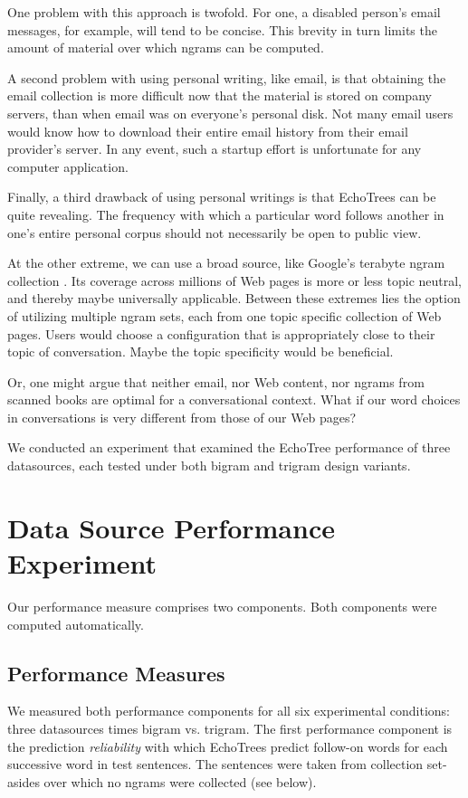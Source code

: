 \documentclass{sigchi}
\begin{document}
One problem with this approach is twofold. For one, a disabled
person's email messages, for example, will tend to be concise. This
brevity in turn limits the amount of material over which ngrams can be
computed. 

A second problem with using personal writing, like email, is that
obtaining the email collection is more difficult now that the material
is stored on company servers, than when email was on everyone's
personal disk. Not many email users would know how to download their
entire email history from their email provider's server. In any event,
such a startup effort is unfortunate for any computer application.

Finally, a third drawback of using personal writings is that EchoTrees
can be quite revealing. The frequency with which a particular word
follows another in one's entire personal corpus should not necessarily
be open to public view.

At the other extreme, we can use a broad source, like Google's
terabyte ngram collection \cite{google1T}. Its coverage across millions of
Web pages is more or less topic neutral, and thereby maybe universally
applicable. Between these extremes lies the option of utilizing
multiple ngram sets, each from one topic specific collection of Web
pages. Users would choose a configuration that is appropriately close
to their topic of conversation. Maybe the topic specificity would be
beneficial. 

Or, one might argue that neither email, nor Web content, nor ngrams
from scanned books \cite{anc} are optimal for a conversational
context. What if our word choices in conversations is very different
from those of our Web pages?

We conducted an experiment that examined the EchoTree performance of
three datasources, each tested under both bigram and trigram design
variants.

\section{Data Source Performance Experiment}

Our performance measure comprises two components. Both components were
computed automatically.

\subsection{Performance Measures}

We measured both performance components for all six experimental
conditions: three datasources times bigram vs. trigram. The first
performance component is the prediction {\em reliability} with which
EchoTrees predict follow-on words for each successive word in test
sentences. The sentences were taken from collection set-asides over
which no ngrams were collected (see below).
\end{document}

